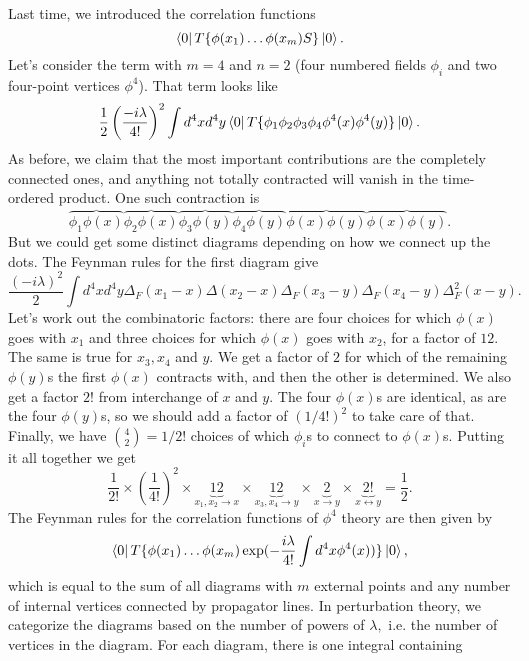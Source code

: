 
Last time, we introduced the correlation functions
$$\left< 0 \right|T\{\phi(x_1)\ldots \phi(x_m) S\}\left| 0 \right>.$$
Let's consider the term with $m=4$ and $n=2$ (four numbered fields $\phi_i$ and two four-point vertices $\phi^4$). That term looks like
$$\frac{1}{2} \left(\frac{-i\lambda}{4!}\right)^2 \int d^4x d^4 y \left< 0 \right|T\{\phi_1 \phi_2 \phi_3 \phi_4 \phi^4(x) \phi^4(y)\}\left| 0 \right>.$$
As before, we claim that the most important contributions are the completely connected ones, and anything not totally contracted will vanish in the time-ordered product. One such contraction is
$$\overbrace{\phi_1 \phi(x)}\overbrace{\phi_2 \phi(x)} \overbrace{\phi_3 \phi(y)} \overbrace{\phi_4 \phi(y)} \overbrace{\phi(x)\phi(y)}\overbrace{\phi(x)\phi(y)}.$$
But we could get some distinct diagrams depending on how we connect up the dots. The Feynman rules for the first diagram %
give
$$\frac{(-i\lambda)^2}{2}\int d^4x d^4 y \Delta_F(x_1-x)\Delta (x_2-x)\Delta_F(x_3-y) \Delta_F(x_4-y) \Delta_F^2(x-y).$$
Let's work out the combinatoric factors: there are four choices for which $\phi(x)$ goes with $x_1$ and three choices for which $\phi(x)$ goes with $x_2$, for a factor of $12$. The same is true for $x_3,x_4$ and $y$. We get a factor of $2$ for which of the remaining $\phi(y)$s the first $\phi(x)$ contracts with, and then the other is determined. We also get a factor $2!$ from interchange of $x$ and $y$. The four $\phi(x)$s are identical, as are the four $\phi(y)$s, so we should add a factor of $(1/4!)^2$ to take care of that. Finally, we have ${4\choose 2}=1/2!$ choices of which $\phi_i$s to connect to $\phi(x)$s. Putting it all together we get
$$\frac{1}{2!}\times \left(\frac{1}{4!}\right)^2 \times \underbrace{12}_{x_1,x_2\to x} \times \underbrace{12}_{x_3,x_4\to y} \times \underbrace{2}_{x\to y} \times \underbrace{2!}_{x\leftrightarrow y} = \frac{1}{2}.$$
The Feynman rules for the correlation functions of $\phi^4$ theory are then given by
$$\left< 0 \right|T\{\phi(x_1)\ldots \phi(x_m)  \exp(-\frac{i\lambda}{4!}\int d^4x \phi^4 (x))\}\left| 0 \right>,$$ which is equal to the sum of all diagrams with $m$ external points and any number of internal vertices connected by propagator lines. In perturbation theory, we categorize the diagrams based on the number of powers of $\lambda,$ i.e. the number of vertices in the diagram. For each diagram, there is one integral containing
